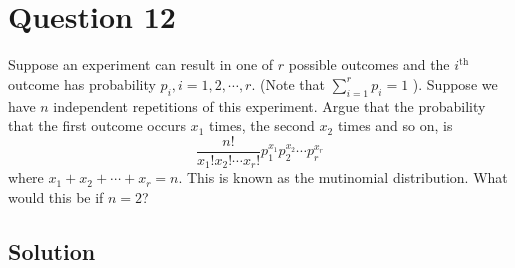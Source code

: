 \section*{Question 12}

Suppose an experiment can result in one of \( r \) possible outcomes and the \( i^{\text {th }} \) outcome has probability \( p_{i}, i=1,2, \cdots, r \).
(Note that \( \sum_{i=1}^{r} p_{i}=1 \) ).
Suppose we have \( n \) independent repetitions of this experiment.
Argue that the probability that the first outcome occurs \( x_{1} \) times, the second \( x_{2} \) times and so on, is
\begin{equation*}
    \frac{n!}{x_{1}!x_{2}!\cdots x_{r}!} p_{1}^{x_{1}} p_{2}^{x_{2}} \cdots p_{r}^{x_{r}}
\end{equation*}
where \( x_{1}+x_{2}+\cdots+x_{r}=n \).
This is known as the mutinomial distribution.
What would this be if \( n=2 \)?

\subsection*{Solution}
